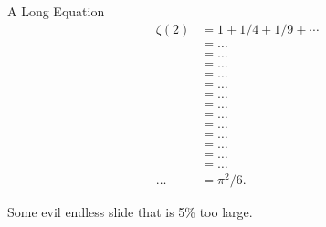 \documentclass{beamer}
\begin{document}
\begin{frame}{A Long Equation}
  \begin{align}
    \zeta(2) &= 1 + 1/4 + 1/9 + \cdots \\
    &= \ldots \\
    &= \ldots \\
    &= \ldots \\
    &= \ldots \\
    &= \ldots \\
    &= \ldots \\
    &= \ldots \\
    &= \ldots \\
    &= \ldots \\
    &= \ldots \\
    &= \ldots \\
    &= \ldots \\
    &= \ldots \\
    \ldots
    &= \pi^2/6.
  \end{align}
\end{frame}


\begin{frame}[plain]
  \begin{centering}%
    \par%
  \end{centering}%
\end{frame}

%
%
%


\begin{frame}[shrink=5]
  Some evil endless slide that is 5\% too large.
\end{frame}


\end{document}
